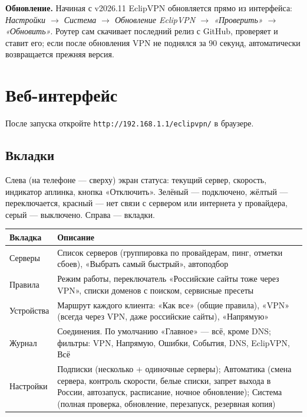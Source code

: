 \documentclass[11pt,a4paper]{article}
\begin{document}
\begin{notebox}
\textbf{Обновление.} Начиная с v2026.11 EclipVPN обновляется прямо из интерфейса: \emph{Настройки $\rightarrow$ Система $\rightarrow$ Обновление EclipVPN $\rightarrow$ «Проверить» $\rightarrow$ «Обновить»}. Роутер сам скачивает последний релиз с GitHub, проверяет и ставит его; если после обновления VPN не поднялся за 90 секунд, автоматически возвращается прежняя версия.
\end{notebox}

\section{Веб-интерфейс}

После запуска откройте \texttt{http://192.168.1.1/eclipvpn/} в браузере.

\subsection{Вкладки}

Слева (на телефоне --- сверху) экран статуса: текущий сервер, скорость, индикатор аплинка, кнопка «Отключить». Зелёный --- подключено, жёлтый --- переключается, красный --- нет связи с сервером или интернета у провайдера, серый --- выключено. Справа --- вкладки.

\begin{tabularx}{\textwidth}{l X}
\toprule
\textbf{Вкладка} & \textbf{Описание} \\
\midrule
Серверы & Список серверов (группировка по провайдерам, пинг, отметки сбоев), «Выбрать самый быстрый», автоподбор \\
Правила & Режим работы, переключатель «Российские сайты тоже через VPN», списки доменов с поиском, сервисные пресеты \\
Устройства & Маршрут каждого клиента: «Как все» (общие правила), «VPN» (всегда через VPN, даже российские сайты), «Напрямую» \\
Журнал & Соединения. По умолчанию «Главное» --- всё, кроме DNS; фильтры: VPN, Напрямую, Ошибки, События, DNS, EclipVPN, Всё \\
Настройки & Подписки (несколько + одиночные серверы); Автоматика (смена сервера, контроль скорости, белые списки, запрет выхода в России, автозапуск, расписание, ночное обновление); Система (полная проверка, обновление, перезапуск, резервная копия) \\
\bottomrule
\end{tabularx}
\end{document}
